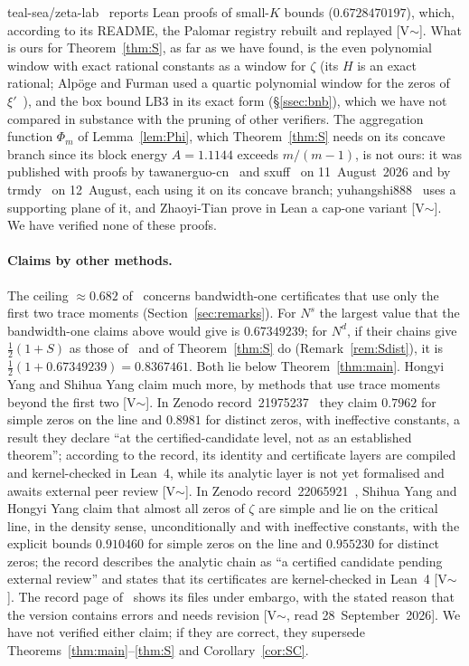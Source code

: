 teal-sea/zeta-lab~\cite{tealsea} reports Lean proofs of small-$K$ bounds ($0.6728470197$), which, according to its README, the Palomar registry
rebuilt and replayed [V$\sim$].
What is ours for Theorem~\ref{thm:S}, as far as we have found, is the even polynomial window with exact rational constants as a window for
$\zeta$ (its $H$ is an exact rational; Alp\"oge and Furman used a quartic polynomial window for the zeros of $\xi'$~\cite[Remark~7.1]{AF}),
and the box bound LB3 in its exact form (\S\ref{ssec:bnb}), which we have not compared in substance with the pruning of other verifiers. The
aggregation function $\Phi_m$ of Lemma~\ref{lem:Phi}, which Theorem~\ref{thm:S} needs on its concave branch since its block energy
$A=1.1144$ exceeds $m/(m-1)$, is not ours: it was published with proofs by tawanerguo-cn~\cite{TawanRepo} and \mbox{sxuff}~\cite{sxuff} on
11~August~2026 and by \mbox{trmdy}~\cite{trmdy} on 12~August, each using it on its concave branch; \mbox{yuhangshi888}~\cite{yuhangshi} uses a supporting
plane of it, and Zhaoyi-Tian prove in Lean a cap-one variant [V$\sim$]. We have verified none of these proofs.

\paragraph{Claims by other methods.}
The ceiling $\approx0.682$ of~\cite[\S7.2]{AF} concerns bandwidth-one certificates that use only the first two trace moments
(Section~\ref{sec:remarks}). For $N^s$ the largest value that the bandwidth-one claims above would give is $0.67349239$; for $N^d$, if their chains give $\frac12(1+S)$ as
those of~\cite[Theorem~A(ii)]{AF} and of Theorem~\ref{thm:S} do (Remark~\ref{rem:Sdist}), it is $\frac12(1+0.67349239)=0.8367461$. Both lie
below Theorem~\ref{thm:main}.
Hongyi Yang and Shihua Yang claim much more, by methods that use trace moments beyond the first two [V$\sim$]. In Zenodo record~21975237~\cite{YY1} they claim $0.7962$ for
simple zeros on the line and $0.8981$ for distinct zeros, with ineffective constants, a result they declare ``at the certified-candidate
level, not as an established theorem''; according to the record, its identity and certificate layers are compiled and kernel-checked in
Lean~4, while its analytic layer is not yet formalised and awaits external peer review [V$\sim$]. In Zenodo record~22065921~\cite{YY2}, Shihua Yang and Hongyi Yang
claim that almost all zeros of $\zeta$ are simple and lie on the critical line, in the density sense, unconditionally and with ineffective
constants, with the explicit bounds $0.910460$ for simple zeros on the line and $0.955230$ for distinct zeros; the record describes the
analytic chain as ``a certified candidate pending external review'' and states that its certificates are kernel-checked in
Lean~4 [V$\sim$]. The record page of~\cite{YY2} shows its files under embargo,
with the stated reason that the version contains errors and needs revision [V$\sim$, read 28~September~2026]. We have not verified either
claim; if they are correct, they supersede Theorems~\ref{thm:main}--\ref{thm:S} and Corollary~\ref{cor:SC}.

